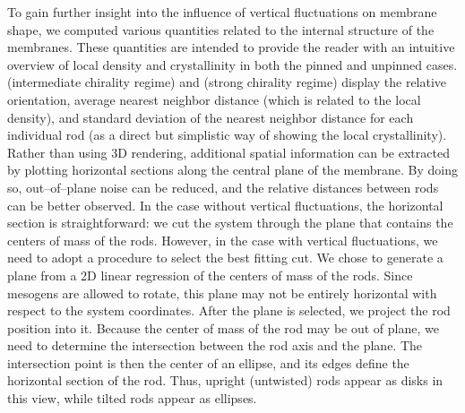 To gain further insight into the influence of vertical fluctuations on membrane shape, we computed various quantities related to the internal structure of the membranes. These quantities are intended to provide the reader with an intuitive overview of local density and crystallinity in both the pinned and unpinned cases.  (intermediate chirality regime) and  (strong chirality regime) display the relative orientation, average nearest neighbor distance (which is related to the local density), and standard deviation of the nearest neighbor distance for each individual rod (as a direct but simplistic way of showing the local crystallinity). Rather than using 3D rendering, additional spatial information can be extracted by plotting horizontal sections along the central plane of the membrane. By doing so, out--of--plane noise can be reduced, and the relative distances between rods can be better observed. In the case without vertical fluctuations, the horizontal section is straightforward: we cut the system through the plane that contains the centers of mass of the rods. However, in the case with vertical fluctuations, we need to adopt a procedure to select the best fitting cut. We chose to generate a plane from a 2D linear regression of the centers of mass of the rods. Since mesogens are allowed to rotate, this plane may not be entirely horizontal with respect to the system coordinates. After the plane is selected, we project the rod position into it. Because the center of mass of the rod may be out of plane, we need to determine the intersection between the rod axis and the plane. The intersection point is then the center of an ellipse, and its edges define the horizontal section of the rod. Thus, upright (untwisted) rods appear as disks in this view, while tilted rods appear as ellipses.

